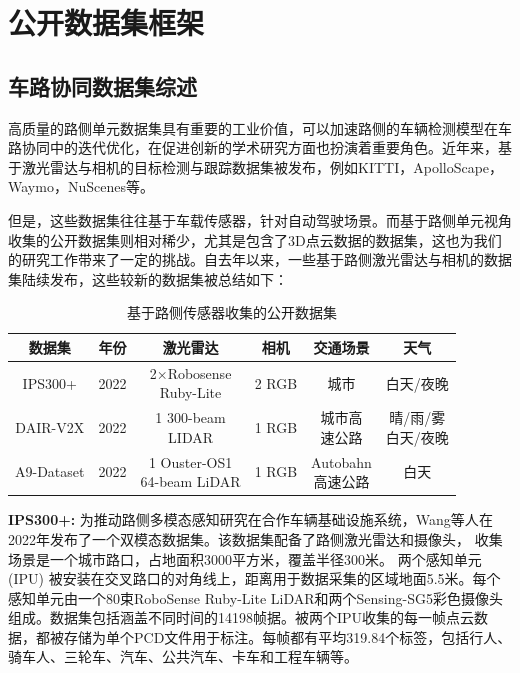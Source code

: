 \newpage
{}
\section{公开数据集框架}

\subsection{车路协同数据集综述}

高质量的路侧单元数据集具有重要的工业价值，可以加速路侧的车辆检测模型在车路协同中的迭代优化，在促进创新的学术研究方面也扮演着重要角色。近年来，基于激光雷达与相机的目标检测与跟踪数据集被发布，例如KITTI\cite{geiger2012we}，ApolloScape\cite{huang2018apolloscape}，Waymo\cite{sun2020scalability}，NuScenes\cite{caesar2020nuscenes}等。

但是，这些数据集往往基于车载传感器，针对自动驾驶场景。而基于路侧单元视角收集的公开数据集则相对稀少，尤其是包含了3D点云数据的数据集，这也为我们的研究工作带来了一定的挑战。自去年以来，一些基于路侧激光雷达与相机的数据集陆续发布，这些较新的数据集被总结如下：\cite{sun2022object}

\begin{table}[htbp]
\centering
\caption{基于路侧传感器收集的公开数据集}
\begin{tabular}{c c c c c c}
\toprule
数据集 & 年份 & 激光雷达 & 相机 & 交通场景 & 天气 \\
\midrule
IPS300+\cite{wang2022ips300+} & 2022 & \makecell{2×Robosense \\ Ruby-Lite} & 2 RGB & 城市 & 白天/夜晚 \\
DAIR-V2X\cite{yu2022dair} & 2022 & \makecell{1 300-beam \\ LIDAR} & 1 RGB & \makecell{城市高\\速公路} & \makecell{晴/雨/雾\\白天/夜晚} \\
A9-Dataset\cite{cress2022a9} & 2022 & \makecell{1 Ouster-OS1 \\ 64-beam LiDAR} & 1 RGB & \makecell{Autobahn\\高速公路} & 白天 \\
\bottomrule
\end{tabular}
\end{table}

\textbf{IPS300+:} 为推动路侧多模态感知研究在合作车辆基础设施系统，Wang等人\cite{wang2022ips300+}在2022年发布了一个双模态数据集。该数据集配备了路侧激光雷达和摄像头， 收集场景是一个城市路口，占地面积3000平方米，覆盖半径300米。 两个感知单元 (IPU) 被安装在交叉路口的对角线上，距离用于数据采集的区域地面5.5米。每个感知单元由一个80束RoboSense Ruby-Lite LiDAR和两个Sensing-SG5彩色摄像头组成。数据集包括涵盖不同时间的14198帧据。被两个IPU收集的每一帧点云数据，都被存储为单个PCD文件用于标注。每帧都有平均319.84个标签，包括行人、骑车人、三轮车、汽车、公共汽车、卡车和工程车辆等。

